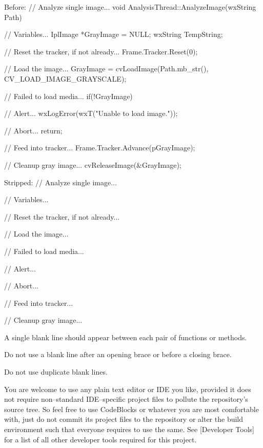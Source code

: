 Before:
\startCodeExample
// Analyze single image...
void AnalysisThread::AnalyzeImage(wxString Path)
{
    // Variables...
    IplImage   *GrayImage   = NULL;
    wxString    TempString;

    // Reset the tracker, if not already...
    Frame.Tracker.Reset(0);

    // Load the image...
    GrayImage = cvLoadImage(Path.mb_str(), CV_LOAD_IMAGE_GRAYSCALE);

        // Failed to load media...
        if(!GrayImage)
        {
            // Alert...
            wxLogError(wxT("Unable to load image."));
            
            // Abort...
            return;
        }

    // Feed into tracker...
    Frame.Tracker.Advance(pGrayImage);
    
    // Cleanup gray image...
    cvReleaseImage(&GrayImage);
}
\stopCodeExample

Stripped:
\startCodeExample
// Analyze single image...

    // Variables...

    // Reset the tracker, if not already...

    // Load the image...

        // Failed to load media...

            // Alert...

            // Abort...

    // Feed into tracker...
    
    // Cleanup gray image...
\stopCodeExample

\item
A single blank line should appear between each pair of functions or methods. 

\item
Do not use a blank line after an opening brace or before a closing brace.

\item
Do not use duplicate blank lines.
\stopitemize


You are welcome to use any plain text editor or IDE you like, provided it does not require non--standard IDE--specific project files to pollute the repository's source tree. So feel free to use CodeBlocks or whatever you are most comfortable with, just do not commit its project files to the repository or alter the build environment such that everyone requires to use the same. See [Developer Tools] for a list of all other developer tools required for this project.

